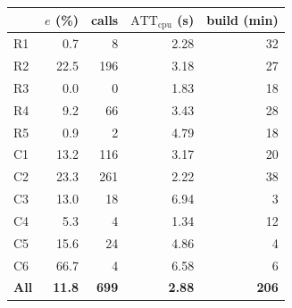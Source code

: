 \begin{tabular}{lrrrr}
\toprule
& $e$ (\%) & calls & $\mathrm{ATT}_{\mathrm{cpu}}$ (s) & build (min) \\
\midrule
R1 & 0.7 & 8 & 2.28 & 32 \\
R2 & 22.5 & 196 & 3.18 & 27 \\
R3 & 0.0 & 0 & 1.83 & 18 \\
R4 & 9.2 & 66 & 3.43 & 28 \\
R5 & 0.9 & 2 & 4.79 & 18 \\
C1 & 13.2 & 116 & 3.17 & 20 \\
C2 & 23.3 & 261 & 2.22 & 38 \\
C3 & 13.0 & 18 & 6.94 & 3 \\
C4 & 5.3 & 4 & 1.34 & 12 \\
C5 & 15.6 & 24 & 4.86 & 4 \\
C6 & 66.7 & 4 & 6.58 & 6 \\
\midrule
\textbf{All} & \textbf{11.8} & \textbf{699} & \textbf{2.88} & \textbf{206} \\
\bottomrule
\end{tabular}
